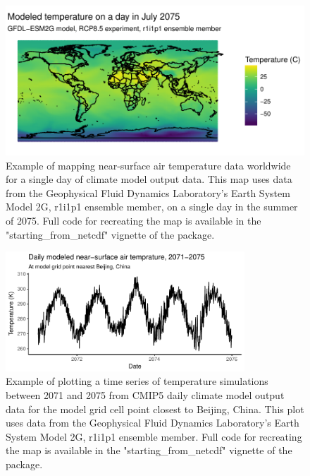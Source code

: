 \begin{figure}
\begin{center}
\includegraphics[width = \textwidth]{worldmapexample}
\end{center}
\caption{Example of mapping near-surface air temperature data worldwide for a single day of climate model output data. This map uses data from the Geophysical Fluid Dynamics Laboratory's Earth System Model 2G, r1i1p1 ensemble member, on a single day in the summer of 2075. Full code for recreating the map is available in the "starting\_from\_netcdf" vignette of the  package.}
\label{fig:worldmap}
\end{figure}

\begin{figure}
\begin{center}
\includegraphics[width = 0.8\textwidth]{timeseriesexample}
\end{center}
\caption{Example of plotting a time series of temperature simulations between 2071 and 2075 from CMIP5 daily climate model output data for the model grid cell point closest to Beijing, China. This plot uses data from the Geophysical Fluid Dynamics Laboratory's Earth System Model 2G, r1i1p1 ensemble member. Full code for recreating the map is available in the "starting\_from\_netcdf" vignette of the  package.}
\label{fig:timeseries}
\end{figure}

